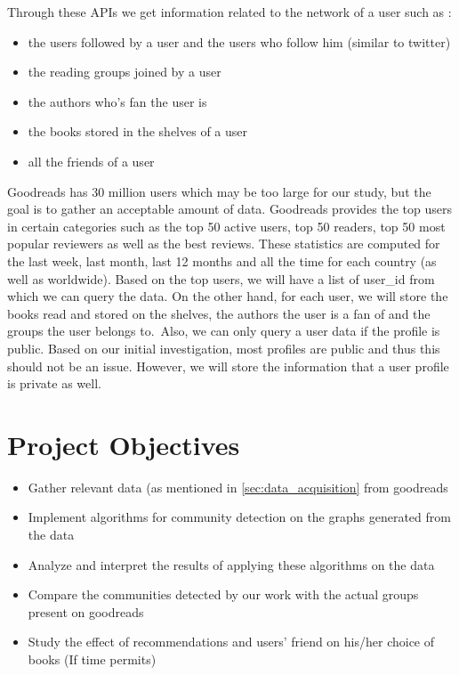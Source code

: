 \documentclass[11pt]{article}
\begin{document}
Through these APIs we get information related to the network of a user such as :
\begin{itemize}
\item the users followed by a user and the users who follow him (similar to twitter)
\item the reading groups joined by a user
\item the authors who's fan the user is
\item the books stored in the shelves of a user
\item all the friends of a user
\end{itemize}

Goodreads has 30 million users which may be too large for our study, but the goal is to gather an acceptable amount of data. Goodreads provides the top users in certain categories such as the top 50 active users, top 50 readers, top 50 most popular reviewers as well as the best reviews. These statistics are computed for the last week, last month, last 12 months and all the time for each country (as well as worldwide).
Based on the top users, we will have a list of user\_id from which we can query the data. On the other hand, for each user, we will store the books read and stored on the shelves, the authors the user is a fan of and the groups the user belongs to.\
Also, we  can only query a user data if the profile is public. Based on our initial investigation, most profiles are public and thus this  should not be an issue. However, we will store the information that a user profile is private as well.

\section{Project Objectives}


\begin{itemize}
\item Gather relevant data (as mentioned in \ref{sec:data_acquisition} from goodreads
\item Implement algorithms for community detection on the graphs generated from the data
\item Analyze and interpret the results of applying these algorithms on the data
\item Compare the communities detected by our work with the actual groups present on goodreads
\item Study the effect of recommendations and users' friend on his/her choice of books (If time permits)
\end{itemize}
\end{document}
